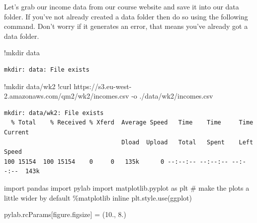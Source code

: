 \documentclass[
  letterpaper,
  DIV=11,
  numbers=noendperiod]{scrreprt}
\newenvironment{Shaded}{\begin{snugshade}}{\end{snugshade}}
\newcommand{\CommentTok}[1]{\textcolor[rgb]{0.37,0.37,0.37}{#1}}
\newcommand{\ErrorTok}[1]{\textcolor[rgb]{0.68,0.00,0.00}{#1}}
\newcommand{\FloatTok}[1]{\textcolor[rgb]{0.68,0.00,0.00}{#1}}
\newcommand{\ImportTok}[1]{\textcolor[rgb]{0.00,0.46,0.62}{#1}}
\newcommand{\NormalTok}[1]{\textcolor[rgb]{0.00,0.23,0.31}{#1}}
\newcommand{\OperatorTok}[1]{\textcolor[rgb]{0.37,0.37,0.37}{#1}}
\newcommand{\StringTok}[1]{\textcolor[rgb]{0.13,0.47,0.30}{#1}}
\begin{document}
Let's grab our income data from our course website and save it into our
data folder. If you've not already created a data folder then do so
using the following command. Don't worry if it generates an error, that
means you've already got a data folder.

\begin{Shaded}
\begin{Highlighting}[]
\OperatorTok{!}\NormalTok{mkdir data}
\end{Highlighting}
\end{Shaded}

\begin{verbatim}
mkdir: data: File exists
\end{verbatim}

\begin{Shaded}
\begin{Highlighting}[]
\OperatorTok{!}\NormalTok{mkdir data}\OperatorTok{/}\NormalTok{wk2}
\OperatorTok{!}\NormalTok{curl https:}\OperatorTok{//}\NormalTok{s3.eu}\OperatorTok{{-}}\NormalTok{west}\OperatorTok{{-}}\FloatTok{2.}\ErrorTok{amazonaws}\NormalTok{.com}\OperatorTok{/}\NormalTok{qm2}\OperatorTok{/}\NormalTok{wk2}\OperatorTok{/}\NormalTok{incomes.csv }\OperatorTok{{-}}\NormalTok{o .}\OperatorTok{/}\NormalTok{data}\OperatorTok{/}\NormalTok{wk2}\OperatorTok{/}\NormalTok{incomes.csv}
\end{Highlighting}
\end{Shaded}

\begin{verbatim}
mkdir: data/wk2: File exists
  % Total    % Received % Xferd  Average Speed   Time    Time     Time  Current
                                 Dload  Upload   Total   Spent    Left  Speed
100 15154  100 15154    0     0   135k      0 --:--:-- --:--:-- --:--:--  143k
\end{verbatim}

\begin{Shaded}
\begin{Highlighting}[]
\ImportTok{import}\NormalTok{ pandas}
\ImportTok{import}\NormalTok{ pylab}
\ImportTok{import}\NormalTok{ matplotlib.pyplot }\ImportTok{as}\NormalTok{ plt}
\CommentTok{\# make the plots a little wider by default}
\OperatorTok{\%}\NormalTok{matplotlib inline}
\NormalTok{plt.style.use(}\StringTok{\textquotesingle{}ggplot\textquotesingle{}}\NormalTok{)}

\NormalTok{pylab.rcParams[}\StringTok{\textquotesingle{}figure.figsize\textquotesingle{}}\NormalTok{] }\OperatorTok{=}\NormalTok{ (}\FloatTok{10.}\NormalTok{, }\FloatTok{8.}\NormalTok{)}
\end{Highlighting}
\end{Shaded}
\end{document}
